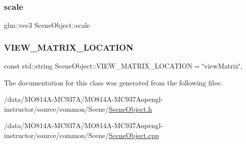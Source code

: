 \hypertarget{class_scene_object_a62c686b880fe4f58dec64a409e56de26}{}\label{class_scene_object_a62c686b880fe4f58dec64a409e56de26}
\subsubsection{\texorpdfstring{scale}{scale}}
{\footnotesize\ttfamily glm\+::vec3 Scene\+Object\+::scale\hspace{0.3cm}{\ttfamily [protected]}}

\hypertarget{class_scene_object_a1c129ecdd6bd8e2f34c713f5dd183361}{}\label{class_scene_object_a1c129ecdd6bd8e2f34c713f5dd183361}
\subsubsection{\texorpdfstring{V\+I\+E\+W\+\_\+\+M\+A\+T\+R\+I\+X\+\_\+\+L\+O\+C\+A\+T\+I\+ON}{VIEW\_MATRIX\_LOCATION}}
{\footnotesize\ttfamily const std\+::string Scene\+Object\+::\+V\+I\+E\+W\+\_\+\+M\+A\+T\+R\+I\+X\+\_\+\+L\+O\+C\+A\+T\+I\+ON = \char`\"{}view\+Matrix\char`\"{}\hspace{0.3cm}{\ttfamily [static]}, {\ttfamily [protected]}}



The documentation for this class was generated from the following files\+:\begin{DoxyCompactItemize}
\item
/data/MO814A-MC937A/MO814A-MC937Aopengl-\/instructor/source/common/\+Scene/\hyperlink{_scene_object_8h}{Scene\+Object.\+h}\item
/data/MO814A-MC937A/MO814A-MC937Aopengl-\/instructor/source/common/\+Scene/\hyperlink{_scene_object_8cpp}{Scene\+Object.\+cpp}\end{DoxyCompactItemize}
